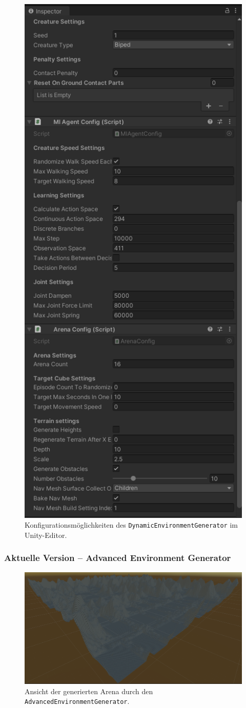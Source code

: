 \begin{figure}
	\centering
	\includegraphics[width=0.5\linewidth]{resources/img/DEGConfig}
	\caption[Konfigurationsmöglichkeiten des \texttt{DynamicEnvironmentGenerator}]{Konfigurationsmöglichkeiten des \texttt{DynamicEnvironmentGenerator} im Unity-Editor.} 
	\label{bspDEGOptionen}
\end{figure}

\subsubsection{Aktuelle Version -- Advanced Environment Generator}
\begin{figure}
	\centering
	\includegraphics[width=0.7\linewidth]{resources/img/AEGArena.png}
	\caption[Konfigurationsmöglichkeiten des \texttt{AdvancedEnvironmentGenerator}]{Ansicht der generierten Arena durch den \texttt{AdvancedEnvironmentGenerator}.} 
	\label{bspAEGArena}
\end{figure}

